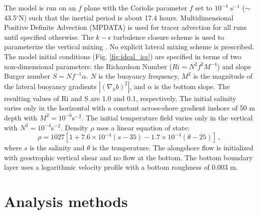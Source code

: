 The model is run on an $f$ plane with the Coriolis parameter $f$ set to $10^{-4}$ s$^{-1}$ ($\sim$ 43.5$^\circ$N) such that the inertial period is about 17.4 hours. Multidimensional Positive Definite Advection (MPDATA) is used for tracer advection \citep{Smolarkiewicz_1998} for all runs until specified otherwise. The $k-\epsilon$ turbulence closure scheme is used to parameterize the vertical mixing \citep{umlauf2003generic, Warner_2005}. No explicit lateral mixing scheme is prescribed. The model initial conditions (Fig. \ref{fig:ideal_ics}) are specified in terms of two non-dimensional parameters: the Richardson Number ($Ri=N^2f^2M^{-4}$) and slope Burger number $S=Nf^{-1}\alpha$. $N$ is the buoyancy frequency, $M^2$ is the magnitude of the lateral buoyancy gradients $|\left(\nabla_h b \right)^2|$, and $\alpha$ is the bottom slope. The resulting values of Ri and S are 1.0 and 0.1, respectively. The initial salinity varies only in the horizontal with a constant across-shore gradient inshore of 50 m depth with $M^2=10^{-6}$s$^{-2}$. The initial temperature field varies only in the vertical with $N^2 = 10^{-4}$s$^{-2}$. Density $\rho$ uses a linear equation of state:
\begin{equation} \label{eqn:EOS}
    \rho = 1027 \left[1+7.6 \times 10^{-4}(s-35)-1.7 \times 10^{-4} (\theta-25) \right] \, , 
\end{equation}
where $s$ is the salinity and $\theta$ is the temperature.
The alongshore flow is initialized with geostrophic vertical shear and no flow at the bottom. The bottom boundary layer uses a logarithmic velocity profile with a bottom roughness of 0.003 m.

\section{Analysis methods} \label{sec:analysis_tools}

